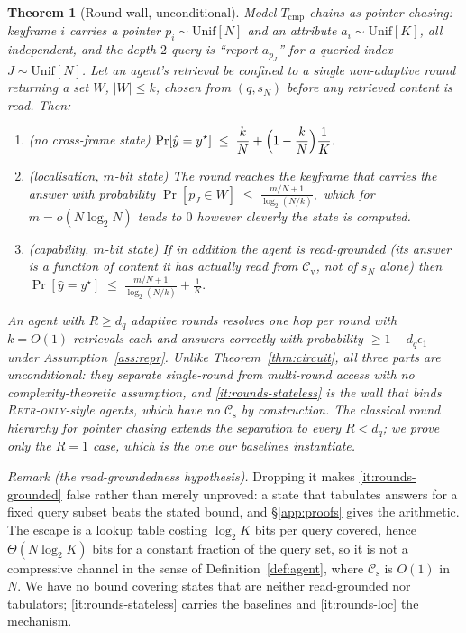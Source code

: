 \documentclass[10pt]{article}
\newtheorem{theorem}{Theorem}
\theoremstyle{definition}
\theoremstyle{plain}
\newcommand{\cs}{\mathcal{C}_{\mathrm{s}}}
\newcommand{\cv}{\mathcal{C}_{\mathrm{v}}}
\begin{document}
\begin{theorem}[Round wall, unconditional]
\label{thm:rounds}
Model $T_{\mathrm{cmp}}$ chains as pointer chasing: keyframe $i$ carries a pointer $p_i\sim\mathrm{Unif}[N]$ and an attribute $a_i\sim\mathrm{Unif}[K]$, all independent, and the depth-$2$ query is ``report $a_{p_J}$'' for a queried index $J\sim\mathrm{Unif}[N]$. Let an agent's retrieval be confined to a \emph{single non-adaptive round} returning a set $W$, $|W|\le k$, chosen from $(q,s_N)$ before any retrieved content is read. Then:
\begin{enumerate}[label=(\roman*),leftmargin=2.1em,itemsep=1pt,topsep=2pt]
\item\label{it:rounds-stateless} \emph{(no cross-frame state)}
$\displaystyle\Pr[\hat y=y^{\star}]\;\le\;\frac{k}{N}+\Bigl(1-\frac kN\Bigr)\frac1K .$
\item\label{it:rounds-loc} \emph{(localisation, $m$-bit state)} The round reaches the keyframe that carries the answer with probability
$\displaystyle\Pr[p_J\in W]\;\le\;\frac{m/N+1}{\log_2(N/k)} ,$
which for $m=o(N\log_2 N)$ tends to $0$ however cleverly the state is computed.
\item\label{it:rounds-grounded} \emph{(capability, $m$-bit state)} If in addition the agent is \emph{read-grounded} (its answer is a function of content it has actually read from $\cv$, not of $s_N$ alone) then
$\displaystyle\Pr[\hat y=y^{\star}]\;\le\;\frac{m/N+1}{\log_2(N/k)}+\frac1K .$
\end{enumerate}
An agent with $R\ge d_q$ \emph{adaptive} rounds resolves one hop per round with $k=O(1)$ retrievals each and answers correctly with probability $\ge 1-d_q\epsilon_1$ under Assumption~\ref{ass:repr}. Unlike Theorem~\ref{thm:circuit}, all three parts are unconditional: they separate single-round from multi-round access with no complexity-theoretic assumption, and \ref{it:rounds-stateless} is the wall that binds \textsc{Retr-only}-style agents, which have no $\cs$ by construction. The classical round hierarchy for pointer chasing \citep{pointerchasing,nisanwigderson} extends the separation to every $R<d_q$; we prove only the $R{=}1$ case, which is the one our baselines instantiate.
\end{theorem}

\emph{Remark (the read-groundedness hypothesis).} Dropping it makes \ref{it:rounds-grounded} false rather than merely unproved: a state that tabulates answers for a fixed query subset beats the stated bound, and \S\ref{app:proofs} gives the arithmetic. The escape is a lookup table costing $\log_2K$ bits per query covered, hence $\Theta(N\log_2K)$ bits for a constant fraction of the query set, so it is not a compressive channel in the sense of Definition~\ref{def:agent}, where $\cs$ is $O(1)$ in $N$. We have no bound covering states that are neither read-grounded nor tabulators; \ref{it:rounds-stateless} carries the baselines and \ref{it:rounds-loc} the mechanism.
\end{document}
